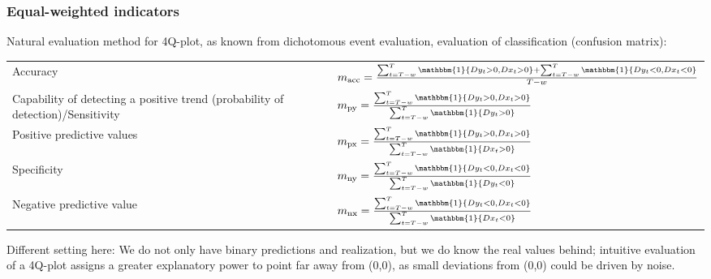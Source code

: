 \documentclass[oneside]{article}
\theoremstyle{plain}%
\theoremstyle{definition}
\newcommand{\ind}[1]{\mathbbm{1}\{#1\}}
\newcommand{\ydiff}{D y}
\newcommand{\xdiff}{Dx}
\begin{document}
\subsubsection{Equal-weighted indicators} \label{sec:equal-weight}

Natural evaluation method for 4Q-plot, as known from dichotomous event evaluation, evaluation of classification (confusion matrix):

\begin{tabularx}{\textwidth}{p{5cm} X}
     Accuracy & $m_{\text{acc}} = \frac{\sum_{t=T-w}^T \ind{\ydiff_t > 0, \xdiff_t > 0} + \sum_{t=T-w}^T \ind{\ydiff_t < 0, \xdiff_t < 0}}{T-w}$ \\
     Capability of detecting a positive trend (probability of detection)/Sensitivity & $m_{\text{py}} = \frac{\sum_{t=T-w}^T \ind{\ydiff_t > 0, \xdiff_t > 0}}{\sum_{t=T-w}^T \ind{\ydiff_t > 0}}$ \\
     Positive predictive values & $ m_{\text{px}} = \frac{\sum_{t=T-w}^T \ind{\ydiff_t > 0, \xdiff_t > 0}}{\sum_{t=T-w}^T \ind{\xdiff_t > 0}}$ \\
     Specificity & $m_{\text{ny}} =  \frac{\sum_{t=T-w}^T \ind{\ydiff_t < 0, \xdiff_t < 0}}{\sum_{t=T-w}^T \ind{\ydiff_t < 0}} $ \\
     Negative predictive value & $m_{\text{nx}} =  \frac{\sum_{t=T-w}^T \ind{\ydiff_t < 0, \xdiff_t < 0}}{\sum_{t=T-w}^T \ind{\xdiff_t < 0}}$
\end{tabularx}

Different setting here: We do not only have binary predictions and realization, but we do know the real values behind; intuitive evaluation of a 4Q-plot assigns a greater explanatory power to point far away from (0,0), as small deviations from (0,0) could be driven by noise.
\end{document}
